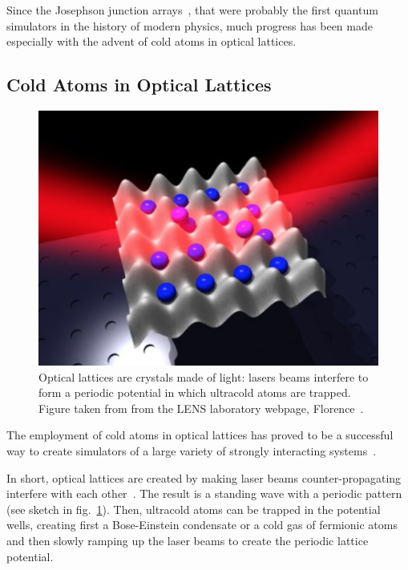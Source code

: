 Since the Josephson junction arrays~\cite{josephsonArrays}, that were probably the first quantum simulators in the history of modern physics, much progress has been made especially with the advent of cold atoms in optical lattices.

\subsection{Cold Atoms in Optical Lattices}
\begin{figure}
    \centering
    \includegraphics[scale=0.7]{Figures/optical_lattice.png}
    \captionsetup{width=1.\linewidth}
    \caption{Optical lattices are crystals made of light: lasers beams interfere to form a periodic potential in which ultracold atoms are trapped. Figure taken from from the LENS laboratory webpage, Florence~\cite{LENS_Florence}.}
    \label{fig:optical_lattice}
\end{figure}

The employment of cold atoms in optical lattices has proved to be a successful way to create simulators of a large variety of strongly interacting systems~\cite{ultracoldAtoms_condMatter}. 

In short, optical lattices are created by making laser beams counter-propagating interfere with each other~\cite{optical_lattice_interview}. The result is a standing wave with a periodic pattern (see sketch in fig.~\ref{fig:optical_lattice}). Then, ultracold atoms can be trapped in the potential wells, creating first a Bose-Einstein condensate or a cold gas of fermionic atoms and then slowly ramping up the laser beams to create the periodic lattice potential. 

